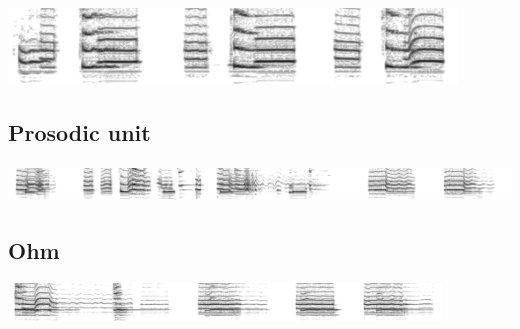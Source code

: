 \includegraphics[height=2cm]{images/chico-separate-together}

\subsection{Prosodic unit}

\includegraphics[height=1cm]{images/chico-pair}

\subsection{Ohm}

\includegraphics[height=1cm]{images/chico-ohm}





